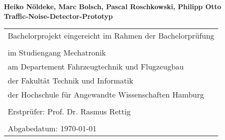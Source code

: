 \thispagestyle{empty}

\begin{center}
\Large{\textbf{Heiko Nöldeke, Marc Bolsch, Pascal Roschkowski, Philipp Otto}} \\  
\vspace{1.5cm}
\LARGE{\textbf{Traffic-Noise-Detector-Prototyp}}
\end{center}

\vspace{14cm}

\begin{tabular}{l}
Bachelorprojekt eingereicht im Rahmen der Bachelorprüfung \\
\\
im Studiengang Mechatronik \\
am Departement Fahrzeugtechnik und Flugzeugbau \\
der Fakultät Technik und Informatik \\
der Hochschule für Angewandte Wissenschaften Hamburg\\
\\
Erstprüfer: Prof. Dr. Rasmus Rettig\\
\\
Abgabedatum: \today
\end{tabular}

\newpage
\restoregeometry